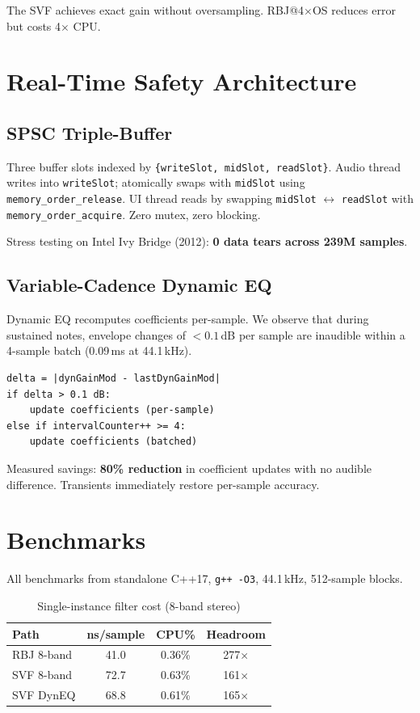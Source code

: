 \documentclass[twocolumn]{article}
\begin{document}
The SVF achieves exact gain without oversampling. RBJ@4$\times$OS reduces error but costs 4$\times$ CPU.

\section{Real-Time Safety Architecture}

\subsection{SPSC Triple-Buffer}

Three buffer slots indexed by \texttt{\{writeSlot, midSlot, readSlot\}}. Audio thread writes into \texttt{writeSlot}; atomically swaps with \texttt{midSlot} using \texttt{memory\_order\_release}. UI thread reads by swapping \texttt{midSlot} $\leftrightarrow$ \texttt{readSlot} with \texttt{memory\_order\_acquire}. Zero mutex, zero blocking.

Stress testing on Intel Ivy Bridge (2012): \textbf{0 data tears across 239M samples}.

\subsection{Variable-Cadence Dynamic EQ}

Dynamic EQ recomputes coefficients per-sample. We observe that during sustained notes, envelope changes of $<0.1$\,dB per sample are inaudible within a 4-sample batch (0.09\,ms at 44.1\,kHz).

\begin{lstlisting}
delta = |dynGainMod - lastDynGainMod|
if delta > 0.1 dB:
    update coefficients (per-sample)
else if intervalCounter++ >= 4:
    update coefficients (batched)
\end{lstlisting}

Measured savings: \textbf{80\% reduction} in coefficient updates with no audible difference. Transients immediately restore per-sample accuracy.

\section{Benchmarks}

All benchmarks from standalone C++17, \texttt{g++ -O3}, 44.1\,kHz, 512-sample blocks.

\begin{table}[h]
\centering
\caption{Single-instance filter cost (8-band stereo)}
\label{tab:benchmarks}
\begin{tabular}{lccc}
\toprule
Path & ns/sample & CPU\% & Headroom \\
\midrule
RBJ 8-band & 41.0 & 0.36\% & 277$\times$ \\
SVF 8-band & 72.7 & 0.63\% & 161$\times$ \\
SVF DynEQ & 68.8 & 0.61\% & 165$\times$ \\
\bottomrule
\end{tabular}
\end{table}
\end{document}
